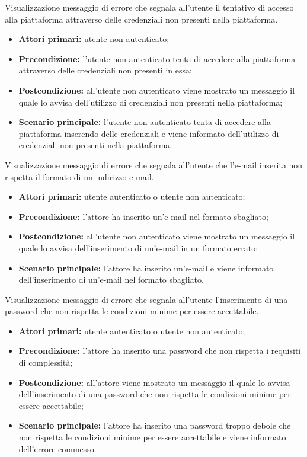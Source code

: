 Visualizzazione messaggio di errore che segnala all'utente il tentativo di accesso alla piattaforma attraverso delle credenziali non presenti nella piattaforma.
\begin{itemize}
    \item \textbf{Attori primari:} utente non autenticato;
    \item \textbf{Precondizione:} l'utente non autenticato tenta di accedere alla piattaforma attraverso delle credenziali non presenti in essa;
    \item \textbf{Postcondizione:} all'utente non autenticato viene mostrato un messaggio il quale lo avvisa dell'utilizzo di credenziali non presenti nella piattaforma;
    \item \textbf{Scenario principale:} l'utente non autenticato tenta di accedere alla piattaforma inserendo delle credenziali e viene informato dell'utilizzo di credenziali non presenti nella piattaforma.
\end{itemize}

\label{estensione:email-non-valida}

Visualizzazione messaggio di errore che segnala all'utente che l'e-mail inserita non rispetta il formato di un indirizzo e-mail.
\begin{itemize}
    \item \textbf{Attori primari:} utente autenticato o utente non autenticato;
    \item \textbf{Precondizione:} l'attore ha inserito un'e-mail nel formato sbagliato;
    \item \textbf{Postcondizione:} all'utente non autenticato viene mostrato un messaggio il quale lo avvisa dell'inserimento di un'e-mail in un formato errato;
    \item \textbf{Scenario principale:} l'attore ha inserito un'e-mail e viene informato dell'inserimento di un'e-mail nel formato sbagliato.
\end{itemize}

\label{estensione:password-non-valida}

Visualizzazione messaggio di errore che segnala all'utente l'inserimento di una password che non rispetta le condizioni minime per essere accettabile.
\begin{itemize}
    \item \textbf{Attori primari:} utente autenticato o utente non autenticato;
    \item \textbf{Precondizione:} l'attore ha inserito una password che non rispetta i requisiti di complessità;
    \item \textbf{Postcondizione:} all'attore viene mostrato un messaggio il quale lo avvisa dell'inserimento di una password che non rispetta le condizioni minime per essere accettabile;
    \item \textbf{Scenario principale:} l'attore ha inserito una password troppo debole che non rispetta le condizioni minime per essere accettabile e viene informato dell'errore commesso.
\end{itemize}

